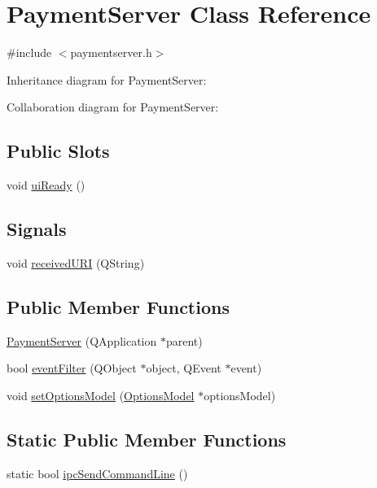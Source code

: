 \hypertarget{class_payment_server}{}\section{Payment\+Server Class Reference}
\label{class_payment_server}


{\ttfamily \#include $<$paymentserver.\+h$>$}



Inheritance diagram for Payment\+Server\+:


Collaboration diagram for Payment\+Server\+:
\subsection*{Public Slots}
\begin{DoxyCompactItemize}
\item 
void \hyperlink{class_payment_server_abb6c65fabbf97ba95381997ca9cd6993}{ui\+Ready} ()
\end{DoxyCompactItemize}
\subsection*{Signals}
\begin{DoxyCompactItemize}
\item 
void \hyperlink{class_payment_server_a19c9f0cb2b54808914f07f9814547ed4}{received\+U\+R\+I} (Q\+String)
\end{DoxyCompactItemize}
\subsection*{Public Member Functions}
\begin{DoxyCompactItemize}
\item 
\hyperlink{class_payment_server_a81890a279d57e2af7b94a5f32f7ded8c}{Payment\+Server} (Q\+Application $\ast$parent)
\item 
bool \hyperlink{class_payment_server_af795e3c318556c833792e530b279efc9}{event\+Filter} (Q\+Object $\ast$object, Q\+Event $\ast$event)
\item 
void \hyperlink{class_payment_server_a468fb163f5172c8428c434631aeb4132}{set\+Options\+Model} (\hyperlink{class_options_model}{Options\+Model} $\ast$options\+Model)
\end{DoxyCompactItemize}
\subsection*{Static Public Member Functions}
\begin{DoxyCompactItemize}
\item 
static bool \hyperlink{class_payment_server_a1cc71c8771bce09eac09f342a4d48220}{ipc\+Send\+Command\+Line} ()
\end{DoxyCompactItemize}


